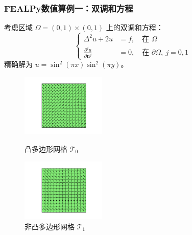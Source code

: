 \documentclass[notheorems,serif]{beamer}
\begin{document}
\begin{frame}
  \frametitle{FEALPy数值算例一：双调和方程}
  考虑区域 $\Omega = (0, 1)\times(0, 1)$ 上的双调和方程：
  $$
  \left\{
  \begin{aligned} 
      \Delta^2 u + 2u & = f, \quad \text{在 } \Omega \\
      \frac{\partial^j u}{\partial \boldsymbol{n}^j} & = 0, \quad \text{在 } \partial\Omega,\ j = 0, 1
  \end{aligned}
  \right.
  $$
  精确解为 $u = \sin^2(\pi x)\sin^2(\pi y)$。

\begin{figure}[htb p]
\centering
\begin{minipage}[t]{0.49\linewidth}
\centering
\includegraphics[width=4cm]{../figures/convex.pdf}
\caption{凸多边形网格 $\mathcal{T}_0$}
\end{minipage}%
\begin{minipage}[t]{0.49\linewidth}
\centering
\includegraphics[width=4cm]{../figures/nonconvex.pdf}
\caption{非凸多边形网格 $\mathcal{T}_1$}
\end{minipage}
\end{figure}
\end{frame}
\end{document}
